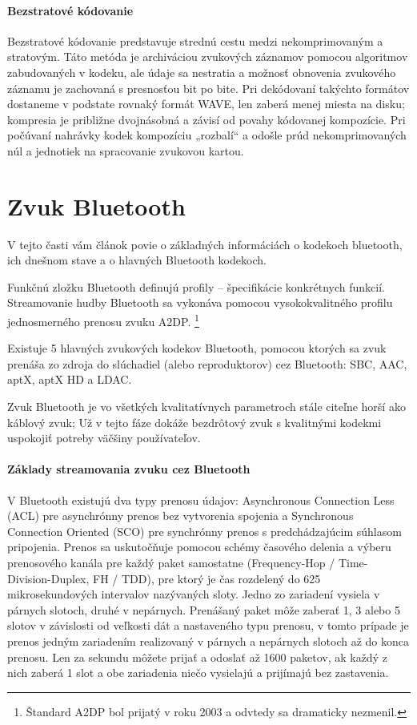 \documentclass[10pt,twoside,slovak,a4paper]{article}
\begin{document}
\paragraph{Bezstratové kódovanie} \label{Bezstratové}\cite{Logvinov}

Bezstratové kódovanie predstavuje strednú cestu medzi nekomprimovaným a stratovým. Táto metóda je archiváciou zvukových záznamov pomocou algoritmov zabudovaných v kodeku, ale údaje sa nestratia a možnosť obnovenia zvukového záznamu je zachovaná s presnosťou bit po bite. Pri dekódovaní takýchto formátov dostaneme v podstate rovnaký formát WAVE, len zaberá menej miesta na disku; kompresia je približne dvojnásobná a závisí od povahy kódovanej kompozície. Pri počúvaní nahrávky kodek kompozíciu „rozbalí“ a odošle prúd nekomprimovaných núl a jednotiek na spracovanie zvukovou kartou. 

\section{Zvuk Bluetooth} \label{bluetooth}

V tejto časti vám článok povie o základných informáciách o kodekoch bluetooth, ich dnešnom stave a o hlavných Bluetooth kodekoch.

Funkčnú zložku Bluetooth definujú profily – špecifikácie konkrétnych funkcií. Streamovanie hudby Bluetooth sa vykonáva pomocou vysokokvalitného profilu jednosmerného prenosu zvuku A2DP. \cite{ValdikSS} \footnote{Štandard A2DP bol prijatý v roku 2003 a odvtedy sa dramaticky nezmenil.}

Existuje 5 hlavných zvukových kodekov Bluetooth, pomocou ktorých sa zvuk prenáša zo zdroja do slúchadiel (alebo reproduktorov) cez Bluetooth: SBC, AAC, aptX, aptX HD a LDAC. \cite {Zukov}

Zvuk Bluetooth je vo všetkých kvalitatívnych parametroch stále citeľne horší ako káblový zvuk; Už v tejto fáze dokáže bezdrôtový zvuk s kvalitnými kodekmi uspokojiť potreby väčšiny používateľov.

\paragraph{Základy streamovania zvuku cez Bluetooth}  \label {streamovanie cez Bluetooth} 

V Bluetooth existujú dva typy prenosu údajov: Asynchronous Connection Less (ACL) pre asynchrónny prenos bez vytvorenia spojenia a Synchronous Connection Oriented (SCO) pre synchrónny prenos s predchádzajúcim súhlasom pripojenia.
Prenos sa uskutočňuje pomocou schémy časového delenia a výberu prenosového kanála pre každý paket samostatne (Frequency-Hop / Time-Division-Duplex, FH / TDD), pre ktorý je čas rozdelený do 625 mikrosekundových intervalov nazývaných sloty. Jedno zo zariadení vysiela v párnych slotoch, druhé v nepárnych. Prenášaný paket môže zaberať 1, 3 alebo 5 slotov v závislosti od veľkosti dát a nastaveného typu prenosu, v tomto prípade je prenos jedným zariadením realizovaný v párnych a nepárnych slotoch až do konca prenosu. Len za sekundu môžete prijať a odoslať až 1600 paketov, ak každý z nich zaberá 1 slot a obe zariadenia niečo vysielajú a prijímajú bez zastavenia. \cite{ValdikSS}
\end{document}
